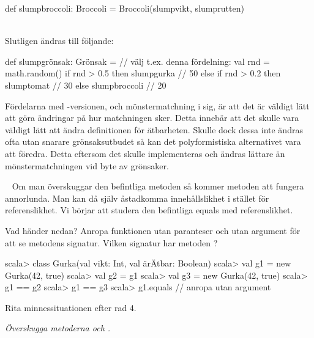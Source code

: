 \begin{Code}
def slumpbroccoli: Broccoli = Broccoli(slumpvikt, slumprutten)
\end{Code}
~\\
Slutligen ändras  till följande:

\begin{Code}
def slumpgrönsak: Grönsak =     // välj t.ex. denna fördelning:
  val rnd = math.random()
  if rnd > 0.5 then slumpgurka      // 50%
  else if rnd > 0.2 then slumptomat // 30%
  else slumpbroccoli             // 20%

\end{Code}

\SubtaskSolved  Fördelarna med -versionen, och mönstermatchning i sig, är att det är väldigt lätt att göra ändringar på hur matchningen sker. Detta innebär att det skulle vara väldigt lätt att ändra definitionen för ätbarheten. Skulle dock dessa inte ändras ofta utan snarare grönsaksutbudet så kan det polyformistiska alternativet vara att föredra. Detta eftersom det skulle implementeras och ändras lättare än mönstermatchningen vid byte av grönsaker.



\QUESTEND






\QUESTBEGIN

\Task  \what~   Om man överskuggar den befintliga metoden  så kommer metoden \code{==} att fungera annorlunda. Man kan då själv åstadkomma innehållslikhet i stället för referenslikhet. Vi börjar att studera den befintliga equals med referenslikhet.

\Subtask \label{subtask:refequals} Vad händer nedan? Anropa funktionen  utan paranteser och utan argument för att se metodens signatur. Vilken signatur har metoden ?
\begin{REPL}
scala> class Gurka(val vikt: Int, val ärÄtbar: Boolean)
scala> val g1 = new Gurka(42, true)
scala> val g2 = g1
scala> val g3 = new Gurka(42, true)
scala> g1 == g2
scala> g1 == g3
scala> g1.equals  // anropa utan argument
\end{REPL}

\Subtask Rita minnessituationen efter rad 4.

\Subtask \emph{Överskugga metoderna  och .}

